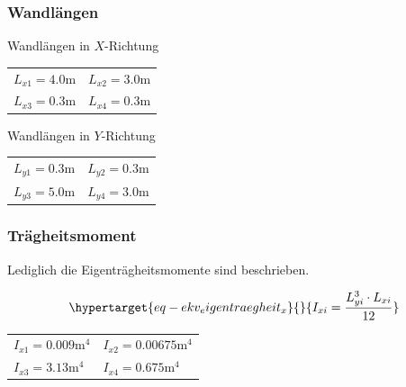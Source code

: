 \documentclass[
  letterpaper,
  DIV=11]{scrreprt}
\begin{document}
\hypertarget{wandluxe4ngen}{%
\subsubsection{Wandlängen}\label{wandluxe4ngen}}

Wandlängen in \(X\)-Richtung

\begin{longtable}[]{@{}
  >{\raggedright\arraybackslash}p{}
  >{\raggedright\arraybackslash}p{}@{}}
\toprule\noalign{}
\endhead
\bottomrule\noalign{}
\endlastfoot
\(L_{x1} = 4.0 \text{m}\) & \(L_{x2} = 3.0 \text{m}\) \\
\(L_{x3} = 0.3 \text{m}\) & \(L_{x4} = 0.3 \text{m}\) \\
\end{longtable}

Wandlängen in \(Y\)-Richtung

\begin{longtable}[]{@{}
  >{\raggedright\arraybackslash}p{}
  >{\raggedright\arraybackslash}p{}@{}}
\toprule\noalign{}
\endhead
\bottomrule\noalign{}
\endlastfoot
\(L_{y1} = 0.3 \text{m}\) & \(L_{y2} = 0.3 \text{m}\) \\
\(L_{y3} = 5.0 \text{m}\) & \(L_{y4} = 3.0 \text{m}\) \\
\end{longtable}

\hypertarget{truxe4gheitsmoment}{%
\subsubsection{Trägheitsmoment}\label{truxe4gheitsmoment}}

Lediglich die Eigenträgheitsmomente sind beschrieben.

\begin{equation}\protect\hypertarget{eq-ekv_eigentraegheit_x}{}{
I_{xi} = \frac{L_{yi}^3 \cdot L_{xi} }{12}
}\label{eq-ekv_eigentraegheit_x}\end{equation}

\begin{longtable}[]{@{}
  >{\raggedright\arraybackslash}p{}
  >{\raggedright\arraybackslash}p{}@{}}
\toprule\noalign{}
\endhead
\bottomrule\noalign{}
\endlastfoot
\(I_{x1} = 0.009 \text{m}^{4}\) & \(I_{x2} = 0.00675 \text{m}^{4}\) \\
\(I_{x3} = 3.13 \text{m}^{4}\) & \(I_{x4} = 0.675 \text{m}^{4}\) \\
\end{longtable}
\end{document}
